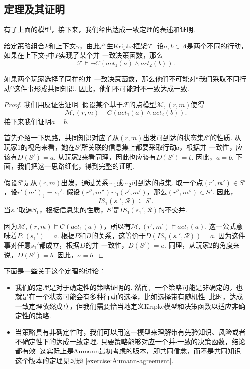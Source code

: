 \subsection{定理及其证明}

有了上面的模型，接下来，我们给出达成一致定理的表述和证明. 

\begin{theorem}[Aumann达成一致定理]
给定策略组合$P$和上下文$\gamma$，由此产生Kripke框架$\mathcal{F}$. 设$a, b \in A$是两个不同的行动，如果在上下文$\gamma$中$P$实现了某个并-一致决策函数，那么
\[
\mathcal{F} \vDash \neg C(act_1(a) \wedge act_2(b)).
\]
\end{theorem}

如果两个玩家选择了同样的并-一致决策函数，那么他们不可能对“我们采取不同行动”这件事形成共同知识. 因此，他们不可能对不一致达成一致. 

\begin{proof}
我们用反证法证明. 假设某个基于$\mathcal{F}$的点模型$\mathcal{M}, (r,m)$使得
\[
\mathcal{M}, (r,m) \vDash C(act_1(a) \wedge act_2(b)).
\]
接下来我们证明$a=b$. 

首先介绍一下思路，共同知识对应了从$(r,m)$出发可到达的状态集$S'$的性质. 从玩家1的视角来看，她在$S'$所关联的信息集上都要采取行动$a$，根据并-一致性，应该有$D(S')=a$. 从玩家2来看同理，因此也应该有$D(S')=b$. 因此，$a=b$. 下面，我们把这一思路细化，得到完整的证明. 

假设$S'$是从$(r,m)$出发，通过关系$\sim_1$或$\sim_2$可到达的点集. 取一个点$(r',m') \in S'$，设$r'(m')_1 = s_1'$. 假设$(r'', m'') \sim_1 (r', m')$，那么$(r'', m'') \in S'$. 因此，
\[
IS_1(s_1', \mathcal{R}) \subseteq S'.
\]
当$s_1'$取遍$S_1$，根据信息集的性质，$S'$是$IS_1(s_1', \mathcal{R})$的不交并. 

因为$\mathcal{M}, (r,m) \vDash C(act_1(a))$，所以有$\mathcal{M}, (r',m') \vDash act_1(a)$. 这一公式意味着$P_1(s_1')=a$. 根据$P$和$D$的关系，这等价于$D(IS_1(s_1', \mathcal{R}))=a$. 因为这件事对任意$s_1'$都成立，根据$D$的并-一致性，$D(S')=a$. 同理，从玩家2的角度来说，$D(S')=b$. 因此，$a=b$. 
\end{proof}

下面是一些关于这个定理的讨论：
\begin{itemize}
    \item 我们的定理是对于确定性的策略证明的. 然而，一个策略可能是非确定的，也就是在一个状态可能会有多种行动的选择，比如选择带有随机性. 此时，达成一致定理依然成立，但我们需要恰当地定义Kripke模型和决策函数以适应非确定性的策略. 
    \item 当策略具有非确定性时，我们可以用这一模型来理解带有先验知识、风险或者不确定性下的达成一致定理. 只要策略能够对应一个并-一致的决策函数，结论都有效. 这实际上是Aumann最初考虑的版本，即共同信念，而不是共同知识. 这个版本的定理见习题 \ref{exercise:Aumann-agreement}.
\end{itemize}

